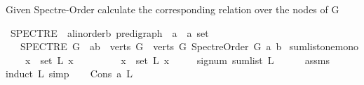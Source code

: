 \begin{isabellebody}
\begin{isamarkuptext}%
Given Spectre-Order calculate the corresponding relation over the nodes of G%
\end{isamarkuptext}\isamarkuptrue%
\isamarkupfalse%
\ SPECTRE\ {\isacharcolon}{\kern0pt}{\isacharcolon}{\kern0pt}\ {\isachardoublequoteopen}{\isacharparenleft}{\kern0pt}{\isacharprime}{\kern0pt}a{\isacharcolon}{\kern0pt}{\isacharcolon}{\kern0pt}linorder{\isacharcomma}{\kern0pt}{\isacharprime}{\kern0pt}b{\isacharparenright}{\kern0pt}\ pre{\isacharunderscore}{\kern0pt}digraph\ {\isasymRightarrow}\ {\isacharparenleft}{\kern0pt}{\isacharprime}{\kern0pt}a\ {\isasymtimes}\ {\isacharprime}{\kern0pt}a{\isacharparenright}{\kern0pt}\ set{\isachardoublequoteclose}\isanewline
\ \ \ {\isachardoublequoteopen}SPECTRE\ G\ {\isasymequiv}\ {\isacharbraceleft}{\kern0pt}{\isacharparenleft}{\kern0pt}a{\isacharcomma}{\kern0pt}b{\isacharparenright}{\kern0pt}\ {\isasymin}\ {\isacharparenleft}{\kern0pt}verts\ G\ {\isasymtimes}\ verts\ G{\isacharparenright}{\kern0pt}{\isachardot}{\kern0pt}\ Spectre{\isacharunderscore}{\kern0pt}Order\ G\ a\ b{\isacharbraceright}{\kern0pt}{\isachardoublequoteclose}%
\isadelimdocument
%
\endisadelimdocument
%
\isatagdocument
%
\isamarkuptrue%
%
\endisatagdocument
{\isafolddocument}%
%
\isadelimdocument
%
\endisadelimdocument
{}\isamarkupfalse%
\ sumlist{\isacharunderscore}{\kern0pt}one{\isacharunderscore}{\kern0pt}mono{\isacharcolon}{\kern0pt}\isanewline
\ \ \ {\isachardoublequoteopen}{\isasymforall}\ x\ {\isasymin}\ set\ L{\isachardot}{\kern0pt}\ x\ {\isasymge}\ {}\ {\isachardoublequoteclose}\isanewline
\ \ \ \ \ {\isachardoublequoteopen}{\isasymexists}\ x\ {\isasymin}\ set\ L{\isachardot}{\kern0pt}\ x\ {\isachargreater}{\kern0pt}\ {}{\isachardoublequoteclose}\isanewline
\ \ \ {\isachardoublequoteopen}signum\ {\isacharparenleft}{\kern0pt}sum{\isacharunderscore}{\kern0pt}list\ L{\isacharparenright}{\kern0pt}\ {\isacharequal}{\kern0pt}\ {}{\isachardoublequoteclose}\isanewline
%
\isadelimproof
\ \ %
\endisadelimproof
%
\isatagproof
{}\isamarkupfalse%
\ assms\ \isanewline
{}\isamarkupfalse%
{\isacharparenleft}{\kern0pt}induct\ L{\isacharcomma}{\kern0pt}\ simp{\isacharparenright}{\kern0pt}\isanewline
\ \ \isamarkupfalse%
\ {\isacharparenleft}{\kern0pt}Cons\ a{}\ L{\isacharparenright}{\kern0pt}\isanewline
\ \ \isamarkupfalse%

\end{isabellebody}
